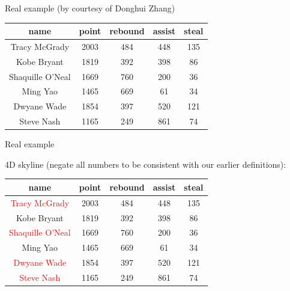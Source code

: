 \documentclass{beamer}
\newcommand{\red}[1]{\textcolor{red}{#1}}
\begin{document}
\begin{frame}{Real example (by courtesy of Donghui Zhang)}
    \begin{small}
		\begin{center}
		\begin{tabular}{c|c|c|c|c}
		    name & point & rebound & assist & steal \\
			\hline
			Tracy McGrady & 2003 & 484 & 448 & 135 \\
			Kobe Bryant & 1819 & 392 & 398 & 86 \\
			Shaquille O'Neal & 1669 & 760 & 200 & 36 \\
			Ming Yao & 1465 & 669 & 61 & 34 \\
			Dwyane Wade & 1854 & 397 & 520 & 121 \\
			Steve Nash & 1165 & 249 & 861 & 74
		\end{tabular}
		\end{center}
    \end{small}
    \end{frame}
\begin{frame}{Real example}
    \begin{small}
		4D skyline (negate all numbers to be consistent with our earlier definitions):
		\begin{center}
		\begin{tabular}{c|c|c|c|c}
		    name & point & rebound & assist & steal \\
			\hline
			\red{Tracy McGrady} & 2003 & 484 & 448 & 135 \\
			Kobe Bryant & 1819 & 392 & 398 & 86 \\
			\red{Shaquille O'Neal} & 1669 & 760 & 200 & 36 \\
			Ming Yao & 1465 & 669 & 61 & 34 \\
			\red{Dwyane Wade} & 1854 & 397 & 520 & 121 \\
			\red{Steve Nash} & 1165 & 249 & 861 & 74
		\end{tabular}
		\end{center}
    \end{small}
    \end{frame}
\end{document}
